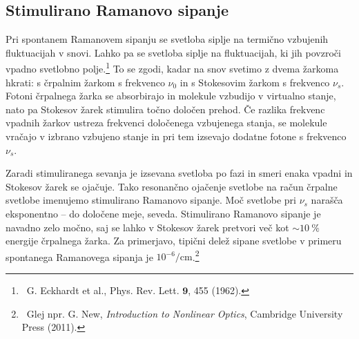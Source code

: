 \subsection*{Stimulirano Ramanovo sipanje}
Pri spontanem Ramanovem sipanju se svetloba siplje na termično vzbujenih fluktuacijah
v snovi. Lahko pa se svetloba siplje na fluktuacijah, ki jih povzroči vpadno
svetlobno polje.\footnote{~G. Eckhardt et al., Phys. Rev. Lett.
$\mathbf{9}$, 455 (1962).} To se zgodi, kadar na snov svetimo z dvema žarkoma hkrati: 
s črpalnim žarkom s frekvenco $\nu_0$ in s Stokesovim žarkom s frekvenco $\nu_s$. 
Fotoni črpalnega žarka se absorbirajo in molekule vzbudijo v virtualno stanje, nato pa 
Stokesov žarek stimulira točno določen prehod. Če razlika frekvenc vpadnih 
žarkov ustreza frekvenci določenega vzbujenega stanja, se  molekule vračajo
v izbrano vzbujeno stanje in pri tem izsevajo dodatne fotone s frekvenco $\nu_s$. 

Zaradi
stimuliranega sevanja je izsevana svetloba po fazi in smeri enaka vpadni in Stokesov
žarek se ojačuje. Tako resonančno ojačenje svetlobe na račun črpalne svetlobe imenujemo stimulirano  
Ramanovo sipanje. Moč svetlobe pri $\nu_s$  narašča eksponentno -- do določene meje, seveda.
Stimulirano Ramanovo sipanje je navadno zelo močno, saj se lahko v Stokesov žarek pretvori 
več kot $\sim 10~\%$ energije črpalnega žarka. Za primerjavo, tipični delež sipane svetlobe v primeru 
spontanega Ramanovega sipanja je $10^{-6}/\si{\centi\meter}$.\footnote{~Glej npr. 
G. New, {\it Introduction to Nonlinear Optics}, Cambridge University Press (2011).}

